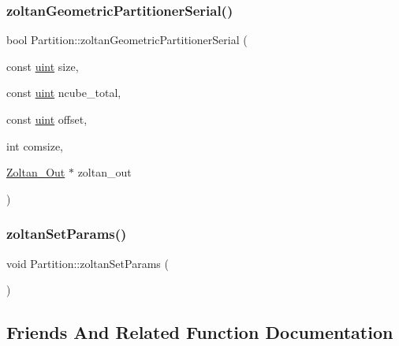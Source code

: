 \mbox{\label{classPartition_a139185844918e181a8ceebbe239d307f}} 
\subsubsection{\texorpdfstring{zoltan\+Geometric\+Partitioner\+Serial()}{zoltanGeometricPartitionerSerial()}}
{\footnotesize\ttfamily bool Partition\+::zoltan\+Geometric\+Partitioner\+Serial (\begin{DoxyParamCaption}\item[{const \mbox{\hyperlink{definitions_8h_a69aa29b598b851b0640aa225a9e5d61d}{uint}}}]{size,  }\item[{const \mbox{\hyperlink{definitions_8h_a69aa29b598b851b0640aa225a9e5d61d}{uint}}}]{ncube\+\_\+total,  }\item[{const \mbox{\hyperlink{definitions_8h_a69aa29b598b851b0640aa225a9e5d61d}{uint}}}]{offset,  }\item[{int}]{comsize,  }\item[{\mbox{\hyperlink{structZoltan__Out}{Zoltan\+\_\+\+Out}} $\ast$}]{zoltan\+\_\+out }\end{DoxyParamCaption})}

\mbox{\label{classPartition_ab1080a75f5acfd3d8b80f3c8d55595e2}} 
\subsubsection{\texorpdfstring{zoltan\+Set\+Params()}{zoltanSetParams()}}
{\footnotesize\ttfamily void Partition\+::zoltan\+Set\+Params (\begin{DoxyParamCaption}{ }\end{DoxyParamCaption})}



\subsection{Friends And Related Function Documentation}
\mbox{\label{classPartition_a8d90a8b4dd53f0733e15d6eed6d2dcdd}} 

